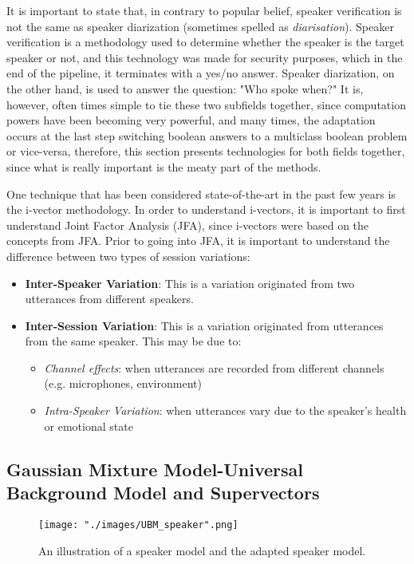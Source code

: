 It is important to state that, in contrary to popular belief, speaker verification is not the same as speaker diarization (sometimes spelled as \textit{diarisation}). Speaker verification is a methodology used to determine whether the speaker is the target speaker or not, and this technology was made for security purposes, which in the end of the pipeline, it terminates with a yes/no answer. Speaker diarization, on the other hand, is used to answer the question: "Who spoke when?" It is, however, often times simple to tie these two subfields together, since computation powers have been becoming very powerful, and many times, the adaptation occurs at the last step switching boolean answers to a multiclass boolean problem or vice-versa, therefore, this section presents technologies for both fields together, since what is really important is the meaty part of the methods.

One technique that has been considered state-of-the-art in the past few years is the i-vector methodology. In order to understand i-vectors, it is important to first understand Joint Factor Analysis (JFA), since i-vectors were based on the concepts from JFA. Prior to going into JFA, it is important to understand the difference between two types of session variations:
\begin{itemize}
    \item \textbf{Inter-Speaker Variation}: This is a variation originated from two utterances from different speakers.
    \item \textbf{Inter-Session Variation}: This is a variation originated from utterances from the same speaker. This may be due to:
    \begin{itemize}
        \item \textit{Channel effects}: when utterances are recorded from different channels (e.g. microphones, environment)
        \item \textit{Intra-Speaker Variation}: when utterances vary due to the speaker's health or emotional state
    \end{itemize}
\end{itemize}

\subsection{Gaussian Mixture Model-Universal Background Model and Supervectors}

\begin{figure}[ht]
\begin{center}
    \texttt{[image: "./images/UBM\_speaker".png]}
    \caption{An illustration of a speaker model and the adapted speaker model. }
    \label{fig::ubm_graphs}
\end{center}
\end{figure}

